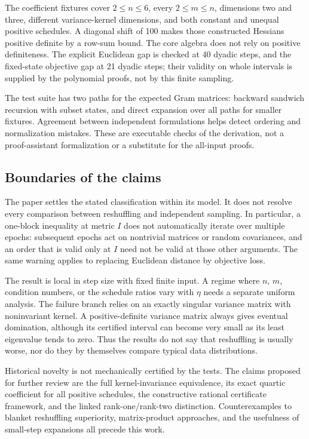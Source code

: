 \documentclass[11pt,letterpaper]{article}
\numberwithin{equation}{section}
\theoremstyle{definition}
\begin{document}
The coefficient fixtures cover $2\le n\le6$, every $2\le m\le n$, dimensions two and three, different variance-kernel dimensions, and both constant and unequal positive schedules. A diagonal shift of 100 makes those constructed Hessians positive definite by a row-sum bound. The core algebra does not rely on positive definiteness. The explicit Euclidean gap is checked at 40 dyadic steps, and the fixed-state objective gap at 21 dyadic steps; their validity on whole intervals is supplied by the polynomial proofs, not by this finite sampling.

The test suite has two paths for the expected Gram matrices: backward sandwich recursion with subset states, and direct expansion over all paths for smaller fixtures. Agreement between independent formulations helps detect ordering and normalization mistakes. These are executable checks of the derivation, not a proof-assistant formalization or a substitute for the all-input proofs.

\subsection{Boundaries of the claims}

The paper settles the stated classification within its model. It does not resolve every comparison between reshuffling and independent sampling. In particular, a one-block inequality at metric $I$ does not automatically iterate over multiple epochs: subsequent epochs act on nontrivial matrices or random covariances, and an order that is valid only at $I$ need not be valid at those other arguments. The same warning applies to replacing Euclidean distance by objective loss.

The result is local in step size with fixed finite input. A regime where $n$, $m$, condition numbers, or the schedule ratios vary with $\eta$ needs a separate uniform analysis. The failure branch relies on an exactly singular variance matrix with noninvariant kernel. A positive-definite variance matrix always gives eventual domination, although its certified interval can become very small as its least eigenvalue tends to zero. Thus the results do not say that reshuffling is usually worse, nor do they by themselves compare typical data distributions.

Historical novelty is not mechanically certified by the tests. The claims proposed for further review are the full kernel-invariance equivalence, its exact quartic coefficient for all positive schedules, the constructive rational certificate framework, and the linked rank-one/rank-two distinction. Counterexamples to blanket reshuffling superiority, matrix-product approaches, and the usefulness of small-step expansions all precede this work.
\end{document}
